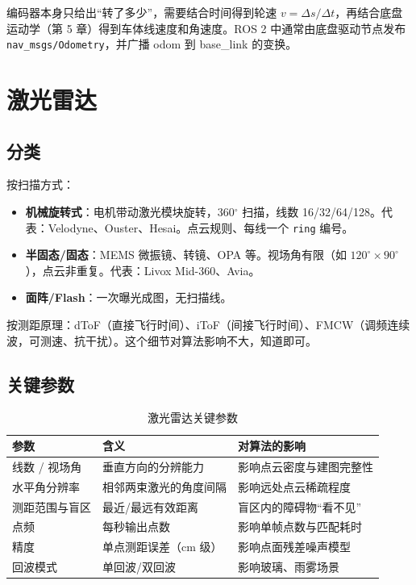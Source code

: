编码器本身只给出“转了多少”，需要结合时间得到轮速 $v=\Delta s/\Delta t$，再结合底盘运动学（第 5 章）得到车体线速度和角速度。ROS 2 中通常由底盘驱动节点发布 \lstinline{nav_msgs/Odometry}，并广播 odom 到 base\_link 的变换。

\section{激光雷达}\label{sec:03-lidar}

\subsection{分类}

按扫描方式：
\begin{itemize}
  \item \textbf{机械旋转式}：电机带动激光模块旋转，360$^\circ$ 扫描，线数 16/32/64/128。代表：Velodyne、Ouster、Hesai。点云规则、每线一个 \lstinline{ring} 编号。
  \item \textbf{半固态/固态}：MEMS 微振镜、转镜、OPA 等。视场角有限（如 $120^\circ\times90^\circ$），点云非重复。代表：Livox Mid-360、Avia。
  \item \textbf{面阵/Flash}：一次曝光成图，无扫描线。
\end{itemize}

按测距原理：dToF（直接飞行时间）、iToF（间接飞行时间）、FMCW（调频连续波，可测速、抗干扰）。这个细节对算法影响不大，知道即可。

\subsection{关键参数}

\begin{table}[htbp]
  \centering
  \caption{激光雷达关键参数}\label{tab:03-lidar-params}
  \small
  \begin{tabular}{p{3.2cm}p{5.2cm}p{4.6cm}}
    \toprule
    参数 & 含义 & 对算法的影响 \\
    \midrule
    线数 / 视场角 & 垂直方向的分辨能力 & 影响点云密度与建图完整性 \\
    水平角分辨率 & 相邻两束激光的角度间隔 & 影响远处点云稀疏程度 \\
    测距范围与盲区 & 最近/最远有效距离 & 盲区内的障碍物“看不见” \\
    点频 & 每秒输出点数 & 影响单帧点数与匹配耗时 \\
    精度 & 单点测距误差（cm 级） & 影响点面残差噪声模型 \\
    回波模式 & 单回波/双回波 & 影响玻璃、雨雾场景 \\
    \bottomrule
  \end{tabular}
\end{table}


